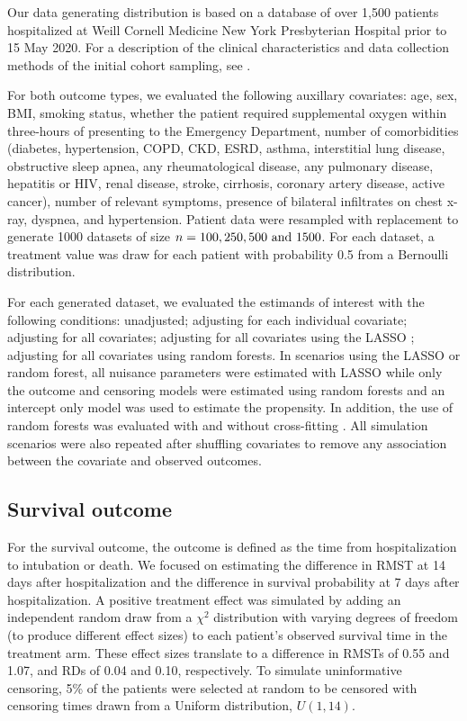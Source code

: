 \documentclass{article}
\begin{document}
Our data generating distribution is based on a database of over 1,500 patients hospitalized at Weill Cornell Medicine New York Presbyterian Hospital prior to 15 May 2020. For a description of the clinical characteristics and data collection methods of the initial cohort sampling, see \citet{goyalNEJM}.

For both outcome types, we evaluated the following auxillary covariates: age, sex, BMI, smoking status, whether the patient required supplemental oxygen within three-hours of presenting to the Emergency Department, number of comorbidities (diabetes, hypertension, COPD, CKD, ESRD, asthma, interstitial lung disease, obstructive sleep apnea, any rheumatological disease, any pulmonary disease, hepatitis or HIV, renal disease, stroke, cirrhosis, coronary artery disease, active cancer), number of relevant symptoms, presence of bilateral infiltrates on chest x-ray, dyspnea, and hypertension. Patient data were resampled with replacement to generate 1000 datasets of size $n = 100, 250, 500 \textnormal{ and } 1500$. For each dataset, a treatment value was draw for each patient with probability 0.5 from a Bernoulli distribution.

For each generated dataset, we evaluated the estimands of interest with the following conditions: unadjusted;  adjusting for each individual covariate; adjusting for all covariates; adjusting for all covariates using the LASSO \citep{tibLASSO}; adjusting for all covariates using random forests. In scenarios using the LASSO or random forest, all nuisance parameters were estimated with LASSO while only the outcome and censoring models were estimated using random forests and an intercept only model was used to estimate the propensity. In addition, the use of random forests was evaluated with and without cross-fitting \citep{cfVictor}. All simulation scenarios were also repeated after shuffling covariates to remove any association between the covariate and observed outcomes.

\subsection{Survival outcome}

For the survival outcome, the outcome is defined as the time from hospitalization to intubation or death. We focused on estimating the difference in RMST at 14 days after hospitalization and the difference in survival probability at 7 days after hospitalization. A positive treatment effect was simulated by adding an independent random draw from a $\chi^2$ distribution with varying degrees of freedom (to produce different effect sizes) to each patient's observed survival time in the treatment arm. These effect sizes translate to a difference in RMSTs of 0.55 and 1.07, and RDs of 0.04 and 0.10, respectively. To simulate uninformative censoring, 5\% of the patients were selected at random to be censored with censoring times drawn from a Uniform distribution, $U(1, 14)$. 
\end{document}
